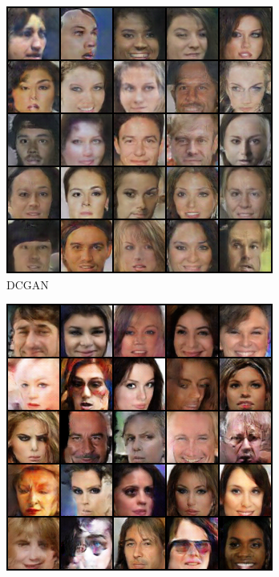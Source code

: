 \documentclass[12pt, a4paper]{article}
\begin{document}
\begin{figure}[H]
	\centering
	\begin{subfigure}[b]{0.475\textwidth}
		\centering
		\includegraphics[width=\textwidth]{DCGAN.png}
		\caption[Network2]%
		{{\small DCGAN}}    
		\label{fig:mean and std of net14}
	\end{subfigure}
	\hfill
	\begin{subfigure}[b]{0.475\textwidth}  
		\centering 
		\includegraphics[width=\textwidth]{SN(1)-DCGAN.png}

\end{subfigure}
\end{figure}
\end{document}
